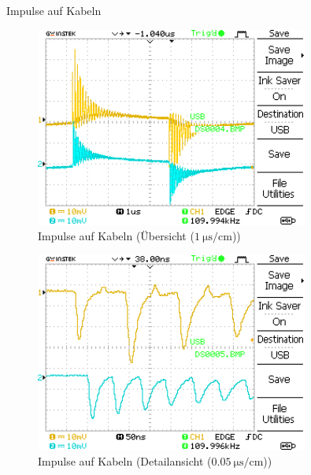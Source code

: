 \documentclass[ngerman]{scrartcl}
\theoremstyle{definition}
\begin{document}
\begin{aufgabe}{Impulse auf Kabeln}
\begin{figure}[H]
				\includegraphics[width=0.8\textwidth]{MesswerteVersuch1/DS0004.png}
				\caption{Impulse auf Kabeln (Übersicht ($\SI{1}{\micro\second\per\centi\meter}$))}
				\label{fig:DS0004}
			\end{figure}
			\begin{figure}[H]
				\centering
				\includegraphics[width=0.8\textwidth]{MesswerteVersuch1/DS0005.png}
				\caption{Impulse auf Kabeln (Detailansicht ($\SI{0.05}{\micro\second\per\centi\meter}$))}
				\label{fig:DS0005}
			\end{figure}
		

			
		\end{aufgabe}
\clearpage
\end{document}

